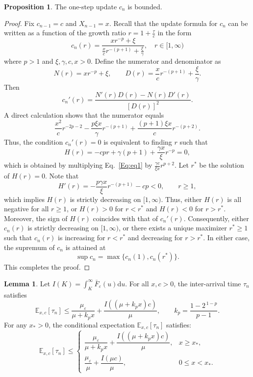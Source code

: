\documentclass[11pt]{article}
\newcommand{\D}{\mathrm{d}}
\theoremstyle{definition}
\newtheorem{lemma}[theorem]{Lemma}
\newtheorem{proposition}[theorem]{Proposition}
\begin{document}
\begin{proposition}
	The one-step update $c_n$ is bounded.
\end{proposition}
\begin{proof}
	Fix $c_{n-1} = c$ and $X_{n-1} = x$. 
	Recall that the update formula for $c_n$ can be written as a function of the growth ratio $r = 1 + \frac{\tau}{c}$ in the form
	$$c_n(r) = \frac{x r^{-p} + \xi}{\frac{x}{c} r^{-(p+1)} + \frac{\xi}{\gamma}}, \quad r \in [1, \infty)$$
	where $p > 1$ and $\xi, \gamma, c, x > 0$.
	Define the numerator and denominator as
	\[
	N(r) = x r^{-p} + \xi,
	\qquad
	D(r) = \frac{x}{c} r^{-(p+1)} + \frac{\xi}{\gamma}.
	\]
	Then
	$$c_n'(r) = \frac{N'(r)D(r) - N(r)D'(r)}{[D(r)]^2}.$$
	A direct calculation shows that the numerator equals
	\begin{equation}
	\frac{x^2}{c}r^{-2p-2} - \frac{p \xi x}{\gamma}r^{-(p+1)} + \frac{(p+1)\xi x}{c}r^{-(p+2)}.\label{Eq:eq1}
	\end{equation}
	Thus, the condition $c_n'(r) = 0$ is equivalent to finding $r$ such that
	$$H(r) = - c p r + \gamma(p+1) + \frac{\gamma x}{\xi} r^{-p} = 0,$$
	which is obtained by multiplying Eq.~\eqref{Eq:eq1} by $\frac{\gamma c}{\xi x} r^{p+2}$.
	Let $r^*$ be the solution of $H(r) =0$.
	Note that
	$$ H'(r) = -\frac{p \gamma x}{\xi} r^{-(p+1)} - cp < 0, \qquad r \geq 1,$$
	which implies $H(r)$ is strictly decreasing on \([1,\infty)\).
	Thus, either $H(r)$ is all negative for all $r \geq 1$, or $H(r) > 0$ for $r < r^*$ and $H(r) < 0$ for $r > r^*$.
	Moreover, the sign of \(H(r)\) coincides with that of \(c_n'(r)\).
	Consequently, either \(c_n(r)\) is strictly decreasing on \([1,\infty)\), or there exists a unique maximizer \(r^* \ge 1\) such that \(c_n(r)\) is increasing for \(r<r^*\) and decreasing for \(r>r^*\).
	In either case, the supremum of \(c_n\) is attained at
	\begin{equation}
	\sup c_{n} = \max \{ c_n(1), c_n(r^*) \}. \label{Eq:max_cn}
	\end{equation}
	This completes the proof.
\end{proof}


\begin{lemma}\label{lem:mean-tau-bound}
	Let $I(K) = \int_{K}^{\infty} \bar{F}_{\varepsilon}(u) \D u$. 
	For all $x,c>0$, the inter-arrival time $\tau_n$ satisfies
	\begin{equation}
		\mathbb{E}_{x,c}[\tau_n] \le \frac{\mu_{\varepsilon}}{\mu + k_p x} + \dfrac{I\left((\mu + k_p x)c\right)}{\mu}, \quad\quad k_p = \frac{1-2^{\,1-p}}{p-1}.
	\end{equation}
	For any $x_* > 0$, the conditional expectation $\mathbb{E}_{x,c}[\tau_n]$ satisfies:
	\[
	\mathbb{E}_{x,c}[\tau_n] \le 
	\begin{cases} 
		\dfrac{\mu_{\varepsilon}}{\mu + k_p x} + \dfrac{I((\mu + k_p x)c)}{\mu}, & x \ge x_*, \\[3ex]
		\dfrac{\mu_{\varepsilon}}{\mu} + \dfrac{I(\mu c)}{\mu}, & 0 \le x < x_*.
	\end{cases}
	\]
\end{lemma}
\end{document}

